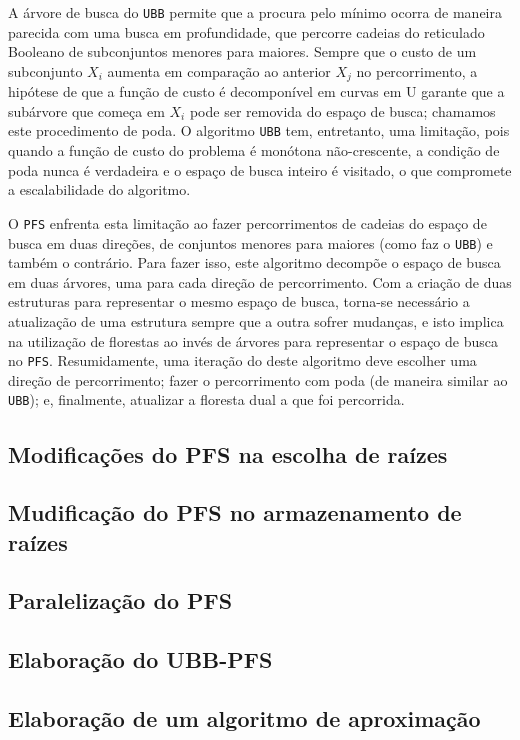\documentclass[12pt]{article}
\newcommand{\algname}[1]{\texttt{#1}}
\begin{document}
A árvore de busca do \algname{UBB} permite que a procura pelo mínimo 
ocorra de maneira parecida com uma busca em profundidade, que percorre
cadeias do reticulado Booleano de subconjuntos menores para maiores. 
Sempre que o custo de um subconjunto $X_i$ aumenta em comparação ao 
anterior $X_j$ no percorrimento, a hipótese de que a função de custo é 
decomponível em curvas em U garante que a subárvore que começa em $X_i$
pode ser removida do espaço de busca; chamamos este procedimento de
poda. O algoritmo \algname{UBB} tem, entretanto, uma limitação, pois
quando a função de custo do problema é monótona não-crescente, a 
condição de poda nunca é verdadeira e o espaço de busca inteiro é 
visitado, o que compromete a escalabilidade do algoritmo.

O \algname{PFS} enfrenta esta limitação ao fazer percorrimentos de
cadeias do espaço de busca em duas direções, de conjuntos menores para
maiores (como faz o \algname{UBB}) e também o contrário. Para fazer 
isso, este algoritmo decompõe o espaço de busca em duas árvores, uma 
para cada direção de percorrimento. Com a criação de duas estruturas 
para representar o mesmo espaço de busca, torna-se necessário a 
atualização de uma estrutura sempre que a outra sofrer mudanças, e isto
implica na utilização de florestas ao invés de árvores para representar
o espaço de busca no \algname{PFS}. Resumidamente, uma iteração do 
deste algoritmo deve escolher uma direção de percorrimento; fazer o 
percorrimento com poda (de maneira similar ao \algname{UBB}); e, 
finalmente, atualizar a floresta dual a que foi percorrida.

\subsection{Modificações do PFS na escolha de raízes}
\subsection{Mudificação do PFS no armazenamento de raízes}
\subsection{Paralelização do PFS}
\subsection{Elaboração do UBB-PFS}
\subsection{Elaboração de um algoritmo de aproximação}
\end{document}
